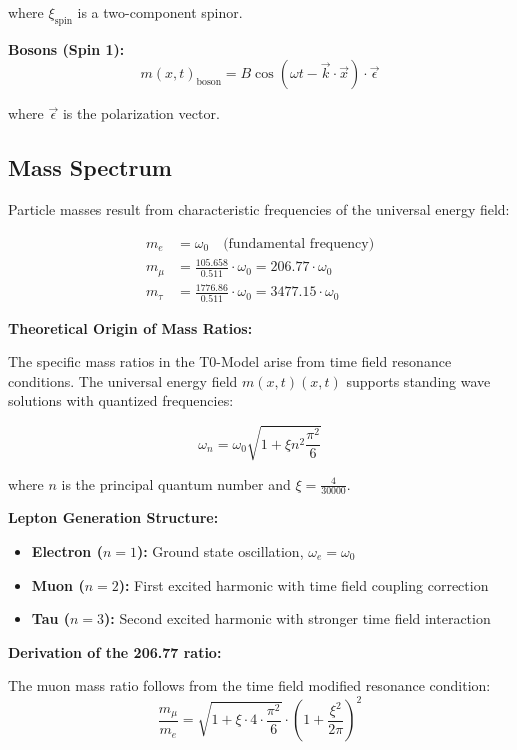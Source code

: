 \documentclass[12pt,a4paper]{report}
\newcommand{\mfield}{m(x,t)}  %
\newcommand{\xipar}{\xi}      %
\begin{document}
	where $\xi_{\text{spin}}$ is a two-component spinor.
	
	\textbf{Bosons (Spin 1):}
	\begin{equation}
		\mfield_{\text{boson}} = B \cos(\omega t - \vec{k} \cdot \vec{x}) \cdot \vec{\epsilon}
	\end{equation}
	
	where $\vec{\epsilon}$ is the polarization vector.
	
	\subsection{Mass Spectrum}\label{subsec:mass_spectrum}
	
	Particle masses result from characteristic frequencies of the universal energy field:
	
	\begin{align}
		m_e &= \omega_0 \quad \text{(fundamental frequency)} \\
		m_\mu &= \frac{105.658}{0.511} \cdot \omega_0 = 206.77 \cdot \omega_0 \\
		m_\tau &= \frac{1776.86}{0.511} \cdot \omega_0 = 3477.15 \cdot \omega_0
	\end{align}
	
	\textbf{Theoretical Origin of Mass Ratios:}
	
	The specific mass ratios in the T0-Model arise from time field resonance conditions. The universal energy field $\mfield(x,t)$ supports standing wave solutions with quantized frequencies:
	
	\begin{equation}
		\omega_n = \omega_0 \sqrt{1 + \xipar n^2 \frac{\pi^2}{6}}
	\end{equation}
	
	where $n$ is the principal quantum number and $\xipar = \frac{4}{30000}$.
	
	\textbf{Lepton Generation Structure:}
	\begin{itemize}
		\item \textbf{Electron ($n=1$):} Ground state oscillation, $\omega_e = \omega_0$
		\item \textbf{Muon ($n=2$):} First excited harmonic with time field coupling correction
		\item \textbf{Tau ($n=3$):} Second excited harmonic with stronger time field interaction
	\end{itemize}
	
	\textbf{Derivation of the 206.77 ratio:}
	
	The muon mass ratio follows from the time field modified resonance condition:
	\begin{equation}
		\frac{m_\mu}{m_e} = \sqrt{1 + \xipar \cdot 4 \cdot \frac{\pi^2}{6}} \cdot \left(1 + \frac{\xipar^2}{2\pi}\right)^2
	\end{equation}
	
\end{document}
